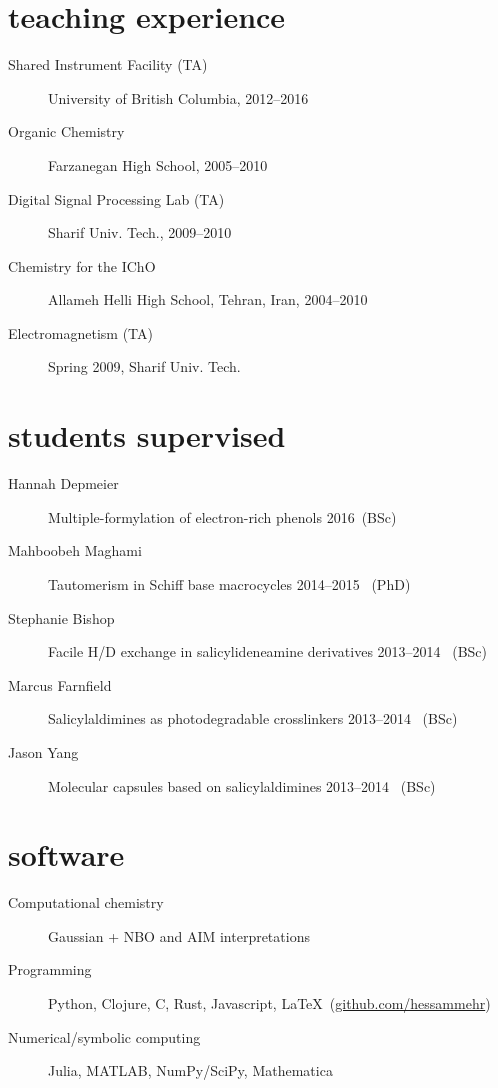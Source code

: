 \documentclass[overlapped,line,10pt,letterpaper]{res}
\begin{document}
\begin{resume}
\section{teaching experience}
\begin{description}
\item[Shared Instrument Facility (TA)] University of British Columbia, 2012–2016
\item[Organic Chemistry] Farzanegan High School, 2005–2010
\item[Digital Signal Processing Lab (TA)] Sharif Univ. Tech., 2009–2010
\item[Chemistry for the IChO] Allameh Helli High School, Tehran, Iran, 2004–2010
\item[Electromagnetism (TA)] Spring 2009, Sharif Univ. Tech.
\end{description}

\section{students supervised}
\begin{description}
\item[Hannah Depmeier] Multiple-formylation of electron-rich phenols \hspace{\fill} 2016\, (BSc)
\item[Mahboobeh Maghami] Tautomerism in Schiff base macrocycles \hspace{\fill} 2014–2015 \, (PhD)
\item[Stephanie Bishop] Facile H/D exchange in salicylideneamine derivatives \hspace{\fill} 2013–2014 \, (BSc)
\item[Marcus Farnfield]  Salicylaldimines as photodegradable crosslinkers \hspace{\fill} 2013–2014 \, (BSc)
\item[Jason Yang]  Molecular capsules based on salicylaldimines \hspace{\fill} 2013–2014 \, (BSc)
\end{description}

\section{software}
\begin{description}
\item[Computational chemistry] Gaussian + NBO and AIM interpretations 
\item[Programming] Python, Clojure, C, Rust, Javascript, \LaTeX \ (\href{https://github.com/hessammehr}{github.com/hessammehr})
\item[Numerical/symbolic computing] Julia, MATLAB, NumPy/SciPy, Mathematica
\end{description}


\end{resume}
\end{document}
